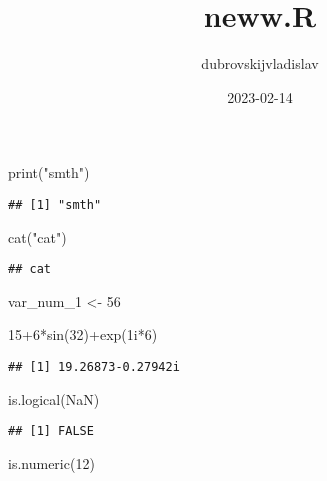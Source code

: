 \documentclass[
]{article}
\title{neww.R}
\author{dubrovskijvladislav}
\date{2023-02-14}
\newenvironment{Shaded}{\begin{snugshade}}{\end{snugshade}}
\newcommand{\ConstantTok}[1]{\textcolor[rgb]{0.00,0.00,0.00}{#1}}
\newcommand{\DecValTok}[1]{\textcolor[rgb]{0.00,0.00,0.81}{#1}}
\newcommand{\FunctionTok}[1]{\textcolor[rgb]{0.00,0.00,0.00}{#1}}
\newcommand{\NormalTok}[1]{#1}
\newcommand{\OtherTok}[1]{\textcolor[rgb]{0.56,0.35,0.01}{#1}}
\newcommand{\SpecialCharTok}[1]{\textcolor[rgb]{0.00,0.00,0.00}{#1}}
\newcommand{\StringTok}[1]{\textcolor[rgb]{0.31,0.60,0.02}{#1}}
\begin{document}
\maketitle

\begin{Shaded}
\begin{Highlighting}[]
\FunctionTok{print}\NormalTok{(}\StringTok{"smth"}\NormalTok{)}
\end{Highlighting}
\end{Shaded}

\begin{verbatim}
## [1] "smth"
\end{verbatim}

\begin{Shaded}
\begin{Highlighting}[]
\FunctionTok{cat}\NormalTok{(}\StringTok{"cat"}\NormalTok{)}
\end{Highlighting}
\end{Shaded}

\begin{verbatim}
## cat
\end{verbatim}

\begin{Shaded}
\begin{Highlighting}[]
\NormalTok{var\_num\_1 }\OtherTok{\textless{}{-}}  \DecValTok{56}



\DecValTok{15}\SpecialCharTok{+}\DecValTok{6}\SpecialCharTok{*}\FunctionTok{sin}\NormalTok{(}\DecValTok{32}\NormalTok{)}\SpecialCharTok{+}\FunctionTok{exp}\NormalTok{(1i}\SpecialCharTok{*}\DecValTok{6}\NormalTok{)}
\end{Highlighting}
\end{Shaded}

\begin{verbatim}
## [1] 19.26873-0.27942i
\end{verbatim}

\begin{Shaded}
\begin{Highlighting}[]
\FunctionTok{is.logical}\NormalTok{(}\ConstantTok{NaN}\NormalTok{)}
\end{Highlighting}
\end{Shaded}

\begin{verbatim}
## [1] FALSE
\end{verbatim}

\begin{Shaded}
\begin{Highlighting}[]
\FunctionTok{is.numeric}\NormalTok{(}\DecValTok{12}\NormalTok{)}
\end{Highlighting}
\end{Shaded}
\end{document}
